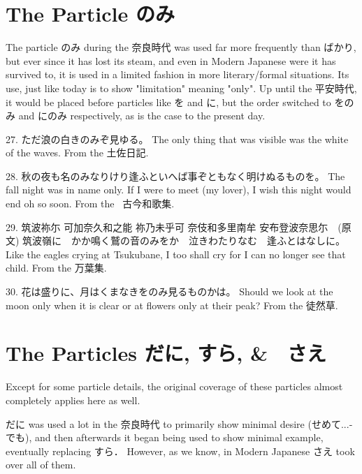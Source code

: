 \section{The Particle のみ}
 
\par{ The particle のみ during the 奈良時代 was used far more frequently than ばかり, but ever since it has lost its steam, and even in Modern Japanese were it has survived to, it is used in a limited fashion in more literary\slash formal situations. Its use, just like today is to show "limitation" meaning "only". Up until the 平安時代, it would be placed before particles like を and に, but the order switched to をのみ and にのみ respectively, as is the case to the present day. }

\par{27. ただ浪の白きのみぞ見ゆる。 \hfill\break
The only thing that was visible was the white of the waves. \hfill\break
From the 土佐日記. }

\par{28. 秋の夜も名のみなりけり逢ふといへば事ぞともなく明けぬるものを。 \hfill\break
The fall night was in name only. If I were to meet (my lover), I wish this night would end oh so soon. \hfill\break
From the  古今和歌集. }

\par{29. 筑波祢尓 可加奈久和之能 祢乃未乎可 奈伎和多里南牟 安布登波奈思尓　(原文) \hfill\break
筑波嶺に　かか鳴く鷲の音のみをか　泣きわたりなむ　逢ふとはなしに。 \hfill\break
Like the eagles crying at Tsukubane, I too shall cry for I can no longer see that child. \hfill\break
From the 万葉集. }

\par{30. 花は盛りに、月はくまなきをのみ見るものかは。 \hfill\break
Should we look at the moon only when it is clear or at flowers only at their peak? \hfill\break
From the 徒然草. }
      
\section{The Particles だに, すら, \&　さえ}
 
\par{ Except for some particle details, the original coverage of these particles almost completely applies here as well. }

\par{ だに was used a lot in the 奈良時代 to primarily show minimal desire (せめて\dothyp{}\dothyp{}\dothyp{}でも), and then afterwards it began being used to show minimal example, eventually replacing すら． However, as we know, in Modern Japanese さえ took over all of them. }

